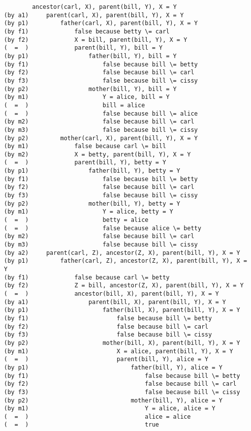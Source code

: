 \begin{verbatim}
        ancestor(carl, X), parent(bill, Y), X = Y
(by a1)     parent(carl, X), parent(bill, Y), X = Y
(by p1)         father(carl, X), parent(bill, Y), X = Y
(by f1)             false because betty \= carl
(by f2)             X = bill, parent(bill, Y), X = Y
(  =  )             parent(bill, Y), bill = Y
(by p1)                 father(bill, Y), bill = Y
(by f1)                     false because bill \= betty
(by f2)                     false because bill \= carl
(by f3)                     false because bill \= cissy
(by p2)                 mother(bill, Y), bill = Y
(by m1)                     Y = alice, bill = Y
(  =  )                     bill = alice
(  =  )                     false because bill \= alice
(by m2)                     false because bill \= carl
(by m3)                     false because bill \= cissy
(by p2)         mother(carl, X), parent(bill, Y), X = Y
(by m1)             false because carl \= bill
(by m2)             X = betty, parent(bill, Y), X = Y
(  =  )             parent(bill, Y), betty = Y
(by p1)                 father(bill, Y), betty = Y
(by f1)                     false because bill \= betty
(by f2)                     false because bill \= carl
(by f3)                     false because bill \= cissy
(by p2)                 mother(bill, Y), betty = Y
(by m1)                     Y = alice, betty = Y
(  =  )                     betty = alice
(  =  )                     false because alice \= betty
(by m2)                     false because bill \= carl
(by m3)                     false because bill \= cissy
(by a2)     parent(carl, Z), ancestor(Z, X), parent(bill, Y), X = Y
(by p1)         father(carl, Z), ancestor(Z, X), parent(bill, Y), X = Y
(by f1)             false because carl \= betty
(by f2)             Z = bill, ancestor(Z, X), parent(bill, Y), X = Y
(  =  )             ancestor(bill, X), parent(bill, Y), X = Y
(by a1)                 parent(bill, X), parent(bill, Y), X = Y
(by p1)                     father(bill, X), parent(bill, Y), X = Y
(by f1)                         false because bill \= betty
(by f2)                         false because bill \= carl
(by f3)                         false because bill \= cissy
(by p2)                     mother(bill, X), parent(bill, Y), X = Y
(by m1)                         X = alice, parent(bill, Y), X = Y
(  =  )                         parent(bill, Y), alice = Y
(by p1)                             father(bill, Y), alice = Y
(by f1)                                 false because bill \= betty
(by f2)                                 false because bill \= carl
(by f3)                                 false because bill \= cissy
(by p2)                             mother(bill, Y), alice = Y
(by m1)                                 Y = alice, alice = Y
(  =  )                                 alice = alice
(  =  )                                 true
\end{verbatim}

